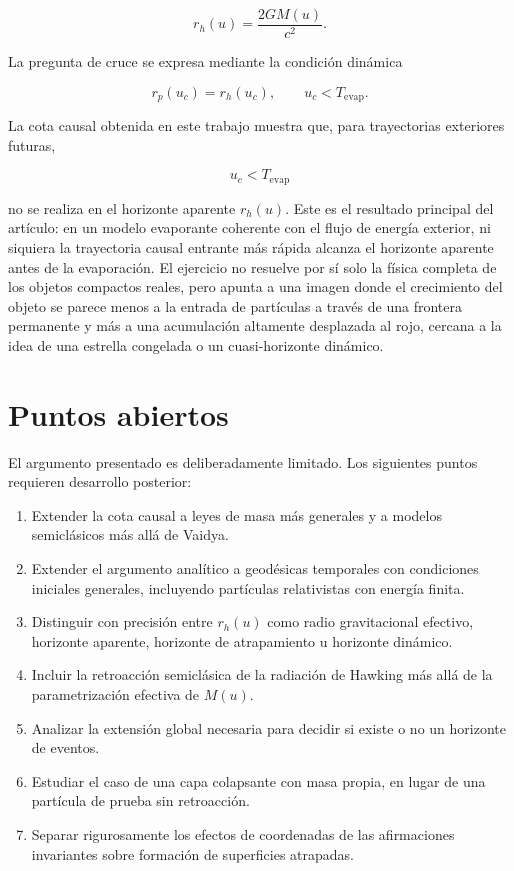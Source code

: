 \documentclass[
aps,
prd,
reprint,
superscriptaddress,
nofootinbib,
amsmath,
amssymb
]{revtex4-2}
\begin{document}
\begin{equation}
r_h(u)=\frac{2GM(u)}{c^2}.
\end{equation}

La pregunta de cruce se expresa mediante la condición dinámica

\begin{equation}
r_p(u_c)=r_h(u_c),
\qquad
u_c<T_{\mathrm{evap}}.
\end{equation}

La cota causal obtenida en este trabajo muestra que, para trayectorias exteriores futuras,

\begin{equation}
u_c<T_{\mathrm{evap}}
\end{equation}

no se realiza en el horizonte aparente $r_h(u)$. Este es el resultado principal del artículo: en un modelo evaporante coherente con el flujo de energía exterior, ni siquiera la trayectoria causal entrante más rápida alcanza el horizonte aparente antes de la evaporación. El ejercicio no resuelve por sí solo la física completa de los objetos compactos reales, pero apunta a una imagen donde el crecimiento del objeto se parece menos a la entrada de partículas a través de una frontera permanente y más a una acumulación altamente desplazada al rojo, cercana a la idea de una estrella congelada o un cuasi-horizonte dinámico.

\section*{Puntos abiertos}

El argumento presentado es deliberadamente limitado. Los siguientes puntos requieren desarrollo posterior:

\begin{enumerate}
\item Extender la cota causal a leyes de masa más generales y a modelos semiclásicos más allá de Vaidya.
\item Extender el argumento analítico a geodésicas temporales con condiciones iniciales generales, incluyendo partículas relativistas con energía finita.
\item Distinguir con precisión entre $r_h(u)$ como radio gravitacional efectivo, horizonte aparente, horizonte de atrapamiento u horizonte dinámico.
\item Incluir la retroacción semiclásica de la radiación de Hawking más allá de la parametrización efectiva de $M(u)$.
\item Analizar la extensión global necesaria para decidir si existe o no un horizonte de eventos.
\item Estudiar el caso de una capa colapsante con masa propia, en lugar de una partícula de prueba sin retroacción.
\item Separar rigurosamente los efectos de coordenadas de las afirmaciones invariantes sobre formación de superficies atrapadas.
\end{enumerate}
\end{document}
